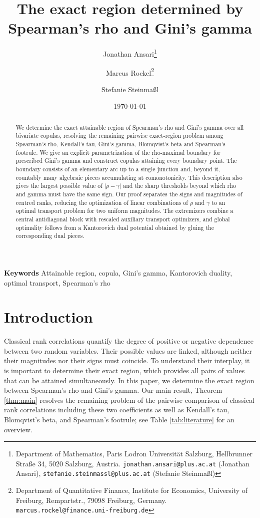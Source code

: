 \documentclass{article}
\title{\textbf{The exact region determined by Spearman's rho and Gini's gamma}}
\author{%
	Jonathan Ansari\thanks{Department of Mathematics, Paris Lodron Universit\"at Salzburg,
	Hellbrunner Stra\ss e 34, 5020 Salzburg, Austria.
	\texttt{jonathan.ansari@plus.ac.at} (Jonathan Ansari),
	\texttt{stefanie.steinmassl@plus.ac.at} (Stefanie Steinma\ss{}l)}
	\and
	Marcus Rockel\thanks{Department of Quantitative Finance, Institute for Economics,
	University of Freiburg, Rempartstr.\;16, 79098 Freiburg, Germany.
	\texttt{marcus.rockel@finance.uni-freiburg.de}}
	\and
	Stefanie Steinma\ss{}l\footnotemark[1]%
}
\date{\today}
\theoremstyle{definition}
\theoremstyle{remark}
\newcommand{\1}{\mathds{1}}
\providecommand{\keywords}[1]{\noindent\textbf{Keywords } #1}
\begin{document}
\maketitle

\begin{abstract}
We determine the exact attainable region of Spearman's rho and Gini's gamma over all bivariate copulas, resolving the remaining pairwise exact-region problem among Spearman's rho, Kendall's tau, Gini's gamma, Blomqvist's beta and Spearman's footrule. 
We give an explicit parametrization of the rho-maximal boundary for prescribed Gini's gamma and construct copulas attaining every boundary point. The boundary consists of an elementary arc up to a single junction and, beyond it, countably many algebraic pieces accumulating at comonotonicity. This description also gives the largest possible value of \(|\rho-\gamma|\) and the sharp thresholds beyond which rho and gamma must have the same sign. Our proof separates the signs and magnitudes of centred ranks, reducing the optimization of linear combinations of \(\rho\) and \(\gamma\) to an optimal transport problem for two uniform magnitudes. The extremizers combine a central antidiagonal block with rescaled auxiliary transport optimizers, and global optimality follows from a Kantorovich dual potential obtained by gluing the corresponding dual pieces.
\end{abstract}

\keywords{Attainable region, copula, Gini's gamma, Kantorovich duality, optimal transport, Spearman's rho}


\section{Introduction}\label{sec:intro}

Classical rank correlations quantify the degree of positive or negative dependence between two random variables. Their possible values are linked, although neither
their magnitudes nor their signs must coincide. To understand their interplay, it is important to determine their exact region, which provides all pairs of values that can be attained simultaneously. 
In this paper, we determine the exact region between Spearman's rho and Gini's gamma.
Our main result, Theorem \ref{thm:main} resolves the remaining problem of the pairwise comparison of classical rank correlations including these two coefficients as well as Kendall's tau, Blomqvist's beta,
and Spearman's footrule; see Table \ref{tab:literature} for an overview.
\end{document}
